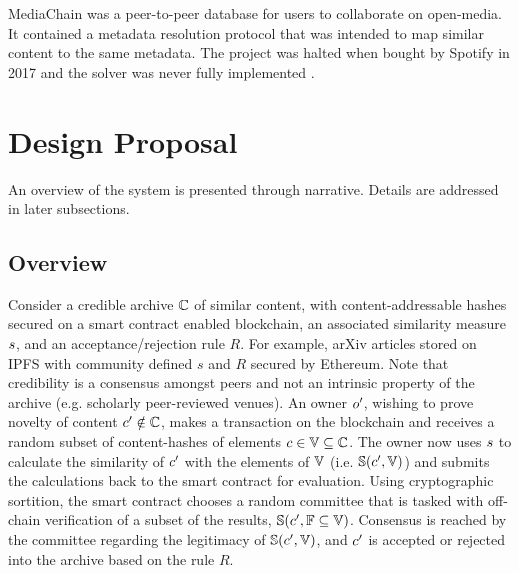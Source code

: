 \documentclass[conference]{IEEEtran}
\begin{document}
MediaChain was a peer-to-peer database for users to collaborate on open-media. It contained a metadata resolution protocol that was intended to map similar content to the same metadata. The project was halted when bought by Spotify in 2017 and the solver was never fully implemented \cite{perez2017spotify}.



\section{Design Proposal}
An overview of the system is presented through narrative. Details are addressed in later subsections. 
\subsection{Overview}\label{overview}
Consider a credible archive ${{\mathbb{C}}}$ of similar content, with content-addressable hashes secured on a smart contract enabled blockchain, an associated similarity measure ${s}$, and an acceptance/rejection rule $R$. For example, arXiv articles stored on IPFS with community defined $s$ and $R$ secured by Ethereum. Note that credibility is a consensus amongst peers and not an intrinsic property of the archive (e.g. scholarly peer-reviewed venues). An owner ${o}^\prime$,  wishing to prove novelty of content ${c}^\prime \notin {{\mathbb{C}}}$, makes a transaction on the blockchain and receives a random subset of content-hashes of elements ${c} \in {\mathbb{V}} \subseteq {{\mathbb{C}}}$. The owner now uses ${s}$ to calculate the similarity of ${c}^\prime$ with the elements of ${\mathbb{V}}$ (i.e. ${\mathbb{S}}({c}^\prime, {\mathbb{V}})$) and submits the calculations back to the smart contract for evaluation. Using cryptographic sortition, the smart contract chooses a random committee that is tasked with off-chain verification of a subset of the results, ${\mathbb{S}}({c}^\prime, {\mathbb{F}} \subseteq {\mathbb{V}})$. Consensus is reached by the committee regarding the legitimacy of ${\mathbb{S}}({c}^\prime, {\mathbb{V}})$, and ${c}^\prime$ is accepted or rejected into the archive based on the rule $R$.

\end{document}
